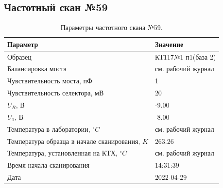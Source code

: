 \subsection{Частотный скан №59}
\begin{table}[!ht]
    \centering
    \caption{Параметры частотного скана №59.}
    \begin{tabular}{|l|l|}
        \hline
        Параметр                                       & Значение                  \\ \hline
        Образец                                        & КТ117№1 п1(база 2)        \\ \hline
        Балансировка моста                             & см. рабочий журнал        \\ \hline
        Чувствительность моста, пФ                     & 1                         \\ \hline
        Чувствительность селектора, мВ                 & 20                        \\ \hline
        $U_R$, В                                       & -9.00                     \\ \hline
        $U_1$, В                                       & -8.00                     \\ \hline
        Температура в лаборатории, $^\circ C$          & см. рабочий журнал        \\ \hline
        Температура образца в начале сканирования, $K$ & 263.26                    \\ \hline
        Температура, установленная на КТХ, $^\circ C$  & см. рабочий журнал        \\ \hline
        Время начала сканирования                      & 14:31:39                  \\ \hline
        Дата                                           & 2022-04-29                \\ \hline
    \end{tabular}
    \label{table:frequency_scan_59}
\end{table}

